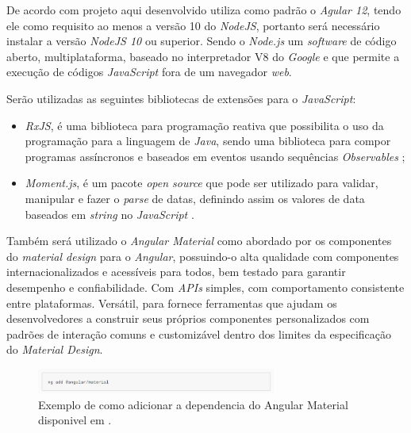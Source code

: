     De acordo com  projeto aqui desenvolvido utiliza como padrão o \textit{Agular 12}, tendo ele como requisito ao menos a versão 10 do \textit{NodeJS}, portanto será necessário instalar a versão \textit{NodeJS 10} ou superior. Sendo o \textit{Node.js} um \textit{software} de código aberto, multiplataforma, baseado no interpretador V8 do \textit{Google} e que permite a execução de códigos \textit{JavaScript} fora de um navegador \textit{web}.
    
    Serão utilizadas as seguintes bibliotecas de extensões para o \textit{JavaScript}:
    
\begin{itemize}

    \item \textit{RxJS}, é uma biblioteca para programação reativa que possibilita o uso da programação para a linguagem de \textit{Java}, sendo uma biblioteca para compor programas assíncronos e baseados em eventos usando sequências \textit{Observables} \cite{rxjs};
    
     \item \textit{Moment.js}, é um pacote \textit{open source} que pode ser utilizado para validar, manipular e fazer o \textit{parse} de datas, definindo assim os valores de data baseados em \textit{string} no  \textit{JavaScript} \cite{moment}.

\end{itemize}

    Também será utilizado o \textit{Angular Material} como abordado por  os componentes do \textit{material design} para o \textit{Angular}, possuindo-o alta qualidade com componentes internacionalizados e acessíveis para todos, bem testado para garantir desempenho e confiabilidade. Com \textit{APIs} simples, com comportamento consistente entre plataformas. Versátil, para fornece ferramentas que ajudam os desenvolvedores a construir seus próprios componentes personalizados com padrões de interação comuns e customizável dentro dos limites da especificação do \textit{Material Design}.
    
        \begin{figure}[h]
        \centering
        \includegraphics[width=0.70\textwidth]{./img/MaterialDesign.png}
        \caption{Exemplo de como adicionar a dependencia do Angular Material disponivel em \cite{material}.}
        \label{fig:MaterialDesign}
        \end{figure}


